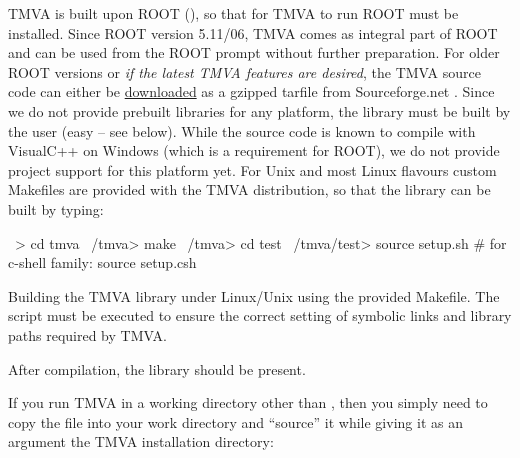 TMVA is built upon ROOT (), so that for TMVA to run ROOT must be 
installed. Since ROOT version 5.11/06, TMVA
comes as integral part of ROOT and can be used from the ROOT prompt 
without further preparation. For older ROOT versions 
or {\em if the latest TMVA features are desired}, the TMVA source code can either be \href{http://sourceforge.net/project/showfiles.php?group_id=152074}{downloaded}
as a gzipped tarfile from Sourceforge.net
.%
Since we do not provide prebuilt libraries for any platform,
the library must be built by the user (easy -- see below).
While the source code is known to compile with VisualC++ on Windows (which is
a requirement for ROOT), we do not provide project support for this platform yet.
For Unix and most Linux flavours custom Makefiles are provided 
with the TMVA distribution, so that the library can be built by typing:
\begin{codeexample}
\begin{tmvacode}
~> cd tmva
~/tmva> make 
~/tmva> cd test
~/tmva/test> source setup.sh # for c-shell family: source setup.csh
\end{tmvacode}
\caption[.]{\codeexampleCaptionSize Building the TMVA library under Linux/Unix using the provided
         Makefile. The  script must be executed to 
         ensure the correct setting of symbolic links and library paths required by TMVA.}
\end{codeexample}
After compilation, the library  should be present.

If you run TMVA in a working directory other than , then you
simply need to copy the  file into your work directory and ``source'' it
while giving it as an argument the TMVA installation directory:

